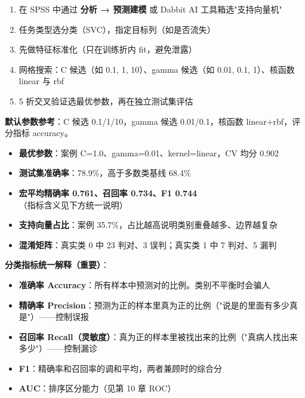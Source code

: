\begin{algosposs}
\begin{enumerate}
    \item 在 SPSS 中通过 \textbf{分析 → 预测建模} 或 Dabbit AI 工具箱选"支持向量机"
    \item 任务类型选分类（SVC），指定目标列（如是否流失）
    \item 先做特征标准化（只在训练折内 fit，避免泄露）
    \item 网格搜索：C 候选（如 0.1, 1, 10）、gamma 候选（如 0.01, 0.1, 1）、核函数 linear 与 rbf
    \item 5 折交叉验证选最优参数，再在独立测试集评估
\end{enumerate}

\textbf{默认参数参考}：C 候选 0.1/1/10，gamma 候选 0.01/0.1，核函数 linear+rbf，评分指标 accuracy。
\end{algosposs}

\begin{algoresult}
\begin{itemize}
    \item \textbf{最优参数}：案例 C=1.0、gamma=0.01、kernel=linear，CV 均分 0.902
    \item \textbf{测试集准确率}：78.9\%，高于多数类基线 68.4\%
    \item \textbf{宏平均精确率 0.761、召回率 0.734、F1 0.744}（指标含义见下方统一说明）
    \item \textbf{支持向量占比}：案例 35.7\%，占比越高说明类别重叠越多、边界越复杂
    \item \textbf{混淆矩阵}：真实类 0 中 23 判对、3 误判；真实类 1 中 7 判对、5 漏判
\end{itemize}

\textbf{分类指标统一解释（重要）}：
\begin{itemize}
    \item \textbf{准确率 Accuracy}：所有样本中预测对的比例。类别不平衡时会骗人
    \item \textbf{精确率 Precision}：预测为正的样本里真为正的比例（"说是的里面有多少真是"）——控制误报
    \item \textbf{召回率 Recall（灵敏度）}：真为正的样本里被找出来的比例（"真病人找出来多少"）——控制漏诊
    \item \textbf{F1}：精确率和召回率的调和平均，两者兼顾时的综合分
    \item \textbf{AUC}：排序区分能力（见第 10 章 ROC）
\end{itemize}
\end{algoresult}

